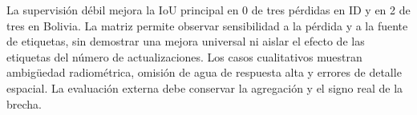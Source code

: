 La supervisión débil mejora la IoU principal en 0 de tres pérdidas en ID y en 2 de tres en Bolivia. La matriz permite observar sensibilidad a la pérdida y a la fuente de etiquetas, sin demostrar una mejora universal ni aislar el efecto de las etiquetas del número de actualizaciones. Los casos cualitativos muestran ambigüedad radiométrica, omisión de agua de respuesta alta y errores de detalle espacial. La evaluación externa debe conservar la agregación y el signo real de la brecha.

